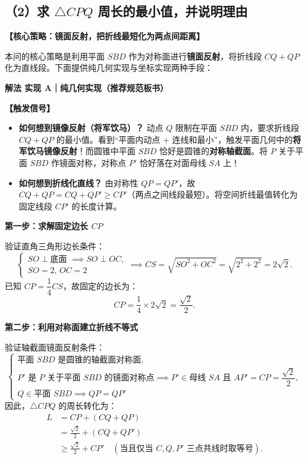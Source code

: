 \documentclass[11pt,a4paper,fontset=fandol]{ctexart}
\newcommand{\method}[1]{\par\medskip\noindent\textbf{解法 #1}\par}
\begin{document}
\subsection*{（2）求 $\triangle CPQ$ 周长的最小值，并说明理由}

\noindent\textbf{【核心策略：镜面反射，把折线最短化为两点间距离】}

本问的核心策略是利用平面 $SBD$ 作为对称面进行\textbf{镜面反射}，将折线段 $CQ + QP$ 化为直线段。下面提供纯几何实现与坐标实现两种手段：

\medskip
\method{实现 A｜纯几何实现（推荐规范板书）}

\noindent\textbf{【触发信号】}
\begin{itemize}[leftmargin=1.5em]
  \item \textbf{如何想到镜像反射（将军饮马）？} 动点 $Q$ 限制在平面 $SBD$ 内，要求折线段 $CQ + QP$ 的最小值。看到“平面内动点 + 连线和最小”，触发平面几何中的\textbf{将军饮马镜像反射}！而圆锥中平面 $SBD$ 恰好是圆锥的\textbf{对称轴截面}。将 $P$ 关于平面 $SBD$ 作镜面对称，对称点 $P'$ 恰好落在对面母线 $SA$ 上！
  \item \textbf{如何想到折线化直线？} 由对称性 $QP = QP'$，故 $CQ + QP = CQ + QP' \ge CP'$（两点之间线段最短）。将空间折线最值转化为固定线段 $CP'$ 的长度计算。
\end{itemize}

\textbf{第一步：求解固定边长 $CP$}

验证直角三角形边长条件：
\[
\begin{cases}
SO \perp \text{底面 } \implies SO \perp OC,\\[0.3em]
SO = 2, \, OC = 2
\end{cases}
\implies CS = \sqrt{SO^2 + OC^2} = \sqrt{2^2 + 2^2} = 2\sqrt{2}.
\]
已知 $CP = \dfrac{1}{4}CS$，故固定的边长为：
\[
CP = \frac{1}{4} \times 2\sqrt{2} = \frac{\sqrt{2}}{2}.
\]

\textbf{第二步：利用对称面建立折线不等式}

验证轴截面镜面反射条件：
\[
\begin{cases}
\text{平面 } SBD \text{ 是圆锥的轴截面对称面},\\[0.3em]
P' \text{ 是 } P \text{ 关于平面 } SBD \text{ 的镜面对称点} \implies P' \in \text{母线 } SA \text{ 且 } AP' = CP = \dfrac{\sqrt{2}}{2},\\[0.4em]
Q \in \text{平面 } SBD \implies QP = QP'
\end{cases}
\]
因此，$\triangle CPQ$ 的周长转化为：
\begin{align*}
L &= CP + (CQ + QP)\\[0.4em]
&= \frac{\sqrt{2}}{2} + (CQ + QP')\\[0.4em]
&\ge \frac{\sqrt{2}}{2} + CP' \quad (\text{当且仅当 } C, Q, P' \text{ 三点共线时取等号}).
\end{align*}
\end{document}
